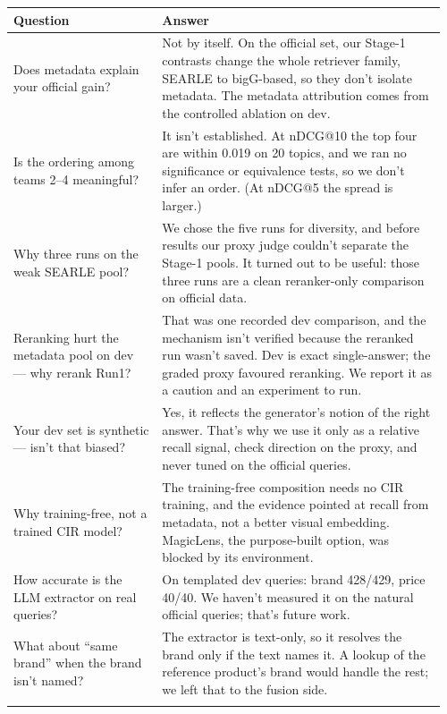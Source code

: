 \documentclass[11pt]{article}
\begin{document}
\begin{longtable}{@{}p{0.33\linewidth}p{0.63\linewidth}@{}}
\toprule
\textbf{Question} & \textbf{Answer} \\ \midrule \endhead
Does metadata explain your official gain? &
Not by itself. On the official set, our Stage-1 contrasts change the whole retriever
family, SEARLE to bigG-based, so they don't isolate metadata. The metadata attribution
comes from the controlled ablation on dev. \\ \addlinespace
Is the ordering among teams 2--4 meaningful? &
It isn't established. At nDCG@10 the top four are within 0.019 on 20 topics, and we ran no
significance or equivalence tests, so we don't infer an order. (At nDCG@5 the spread is
larger.) \\ \addlinespace
Why three runs on the weak SEARLE pool? &
We chose the five runs for diversity, and before results our proxy judge couldn't separate
the Stage-1 pools. It turned out to be useful: those three runs are a clean
reranker-only comparison on official data. \\ \addlinespace
Reranking hurt the metadata pool on dev --- why rerank Run1? &
That was one recorded dev comparison, and the mechanism isn't verified because the reranked
run wasn't saved. Dev is exact single-answer; the graded proxy favoured reranking. We report
it as a caution and an experiment to run. \\ \addlinespace
Your dev set is synthetic --- isn't that biased? &
Yes, it reflects the generator's notion of the right answer. That's why we use it only as a
relative recall signal, check direction on the proxy, and never tuned on the official
queries. \\ \addlinespace
Why training-free, not a trained CIR model? &
The training-free composition needs no CIR training, and the evidence pointed at recall from
metadata, not a better visual embedding. MagicLens, the purpose-built option, was blocked
by its environment. \\ \addlinespace
How accurate is the LLM extractor on real queries? &
On templated dev queries: brand 428/429, price 40/40. We haven't measured it on the
natural official queries; that's future work. \\ \addlinespace
What about ``same brand'' when the brand isn't named? &
The extractor is text-only, so it resolves the brand only if the text names it. A lookup
of the reference product's brand would handle the rest; we left that to the fusion side. \\ \addlinespace

\end{longtable}
\end{document}
